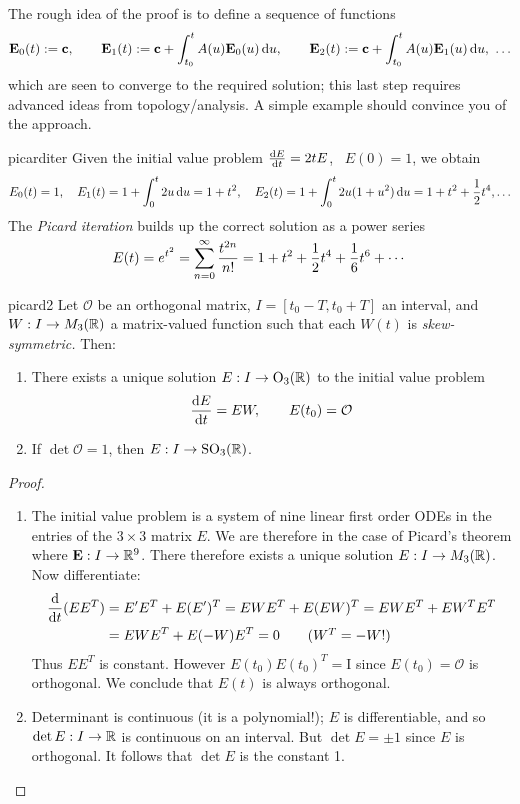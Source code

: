 \goodbreak

The rough idea of the proof is to define a sequence of functions
\[
	\vE_0(t):=\vc,\qquad \vE_1(t):=\vc+\int_{t_0}^tA(u)\vE_0(u)\,\du,\qquad \vE_2(t):=\vc+\int_{t_0}^tA(u)\vE_1(u)\,\du,\ \ldots
\]
which are seen to converge to the required solution; this last step requires advanced ideas from topology/analysis. A simple example should convince you of the approach.

\begin{example}{}{picarditer}
	Given the initial value problem $\diff[E]{t}=2tE$, \ $E(0)=1$, we obtain
	\begin{gather*}
		E_0(t)=1,\quad E_1(t)=1+\int_0^t 2u\,\du=1+t^2,\quad
		E_2(t)=1+\int_0^t2u(1+u^2)\,\du =1+t^2+\frac 12t^4,\ldots
	\end{gather*}
	The \emph{Picard iteration} builds up the correct solution as a power series
	\[
		E(t)=e^{t^2}=\smash[t]{\sum\limits_{n=0}^\infty\frac{t^{2n}}{n!}}=1+t^2+\frac 12t^4+\frac 16t^6+\cdots
	\]
\end{example}



\begin{cor}{}{picard2}
	Let $\mathcal O$ be an orthogonal matrix, $I=[t_0-T,t_0+T]$ an interval, and $W:I\to M_3(\R)$ a matrix-valued function such that each $W(t)$ is \emph{skew-symmetric.}  Then:
	\begin{enumerate}\itemsep0pt
	  \item There exists a unique solution $E:I\to \rO_3(\R)$ to the initial value problem
	  \[
	  	\diff[E]{t}=E W,\qquad E(t_0)=\mathcal O
	  \]
	  \item If $\det\mathcal O=1$, then $E:I\to\rSO_3(\R)$.
	\end{enumerate}
\end{cor}

\begin{proof}
	\begin{enumerate}
	  \item The initial value problem is a system of nine linear first order ODEs in the entries of the $3\times 3$ matrix $E$. We are therefore in the case of Picard's theorem where $\vE:I\to\R^9$. There therefore exists a unique solution $E:I\to M_3(\R)$. Now differentiate:
	  \begin{align*}
	  	\diff t(EE^T)&=E'E^T+E(E')^T =EWE^T+E(EW)^T =EWE^T+EW^TE^T\\
	  	&=EWE^T+E(-W)E^T=0 \tag{$W^T=-W$!}
	  \end{align*}
	  Thus $EE^T$ is constant. However $E(t_0)E(t_0)^T=\mathrm I$ since $E(t_0)=\mathcal O$ is orthogonal. We conclude that $E(t)$ is always orthogonal.
	  \item Determinant is continuous (it is a polynomial!); $E$ is differentiable, and so $\det E:I\to\R$ is continuous on an interval. But $\det E=\pm 1$ since $E$ is orthogonal. It follows that $\det E$ is the constant 1.\qedhere
	\end{enumerate}
\end{proof}

